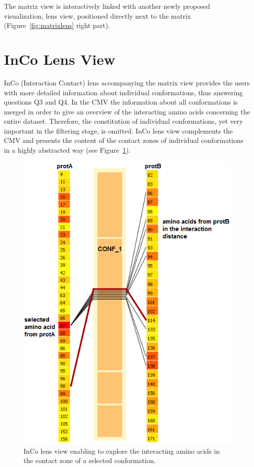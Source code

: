 \documentclass[journal]{vgtc}                %
\begin{document}
The matrix view is interactively linked with another newly proposed visualization, lens view, positioned directly next to the matrix (Figure~\ref{fig:matrixlens} right part). 

\section{InCo Lens View}
InCo (Interaction Contact) lens accompanying the matrix view provides the users with more detailed information about individual conformations, thus answering questions Q3 and Q4.
In the CMV the information about all conformations is merged in order to give an overview of the interacting amino acids concerning the entire dataset.
Therefore, the constitution of individual conformations, yet very important in the filtering stage, is omitted.
InCo lens view complements the CMV and presents the content of the contact zones of individual conformations in a highly abstracted way (see Figure~\ref{fig:inco}).

\begin{figure}[bt]
  \centering
  \includegraphics[width=0.8\columnwidth]{inco.png}
  \caption{InCo lens view enabling to explore the interacting amino acids in the contact zone of a selected conformation.}
  \label{fig:inco}
\end{figure}
\end{document}
